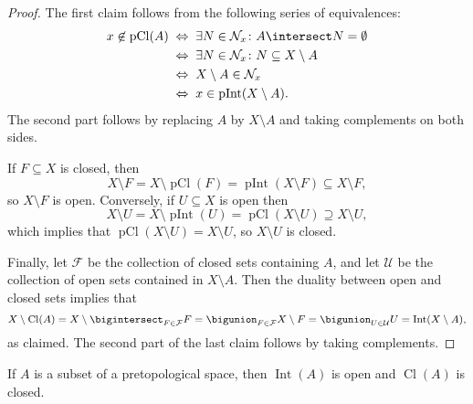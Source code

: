 \documentclass[article, a4paper, 11pt, oneside]{memoir}
\numberwithin{equation}{chapter}
\newcommand{\calU}{\mathcal{U}}
\newcommand{\calF}{\mathcal{F}}
\newcommand{\calN}{\mathcal{N}}
\newcommand{\nhoods}[1]{\calN_{#1}}
\newcommand{\pInt}[1]{\operatorname{pInt}(#1)}
\newcommand{\pCl}[1]{\operatorname{pCl}(#1)}
\renewcommand{\interior}[1]{\operatorname{Int}(#1)}
\renewcommand{\closure}[1]{\operatorname{Cl}(#1)}
\renewcommand{\iff}{\Leftrightarrow}
\begin{document}
\begin{proof}
    The first claim follows from the following series of equivalences:
    \begin{align*}
        x \not\in \pCl{A}
            &\;\iff\; \exists N \in \nhoods{x} \colon A \intersect N = \emptyset \\
            &\;\iff\; \exists N \in \nhoods{x} \colon N \subseteq X \setminus A \\
            &\;\iff\; X \setminus A \in \nhoods{x} \\
            &\;\iff\; x \in \pInt{X \setminus A}.
    \end{align*}
    The second part follows by replacing $A$ by $X \setminus A$ and taking complements on both sides.
    
    If $F \subseteq X$ is closed, then
    \begin{equation*}
        X \setminus F
            = X \setminus \pCl{F}
            = \pInt{X \setminus F}
            \subseteq X \setminus F,
    \end{equation*}
    so $X \setminus F$ is open. Conversely, if $U \subseteq X$ is open then
    \begin{equation*}
        X \setminus U
            = X \setminus \pInt{U}
            = \pCl{X \setminus U}
            \supseteq X \setminus U,
    \end{equation*}
    which implies that $\pCl{X \setminus U} = X \setminus U$, so $X \setminus U$ is closed.
    
    Finally, let $\calF$ be the collection of closed sets containing $A$, and let $\calU$ be the collection of open sets contained in $X \setminus A$. Then the duality between open and closed sets implies that
    \begin{equation*}
        X \setminus \closure{A}
            = X \setminus \bigintersect_{F \in \calF} F
            = \bigunion_{F \in \calF} X \setminus F
            = \bigunion_{U \in \calU} U
            = \interior{X \setminus A},
    \end{equation*}
    as claimed. The second part of the last claim follows by taking complements.
\end{proof}

\begin{corollary}
    \label{thm:interior-open-closure-closed}
    If $A$ is a subset of a pretopological space, then $\interior{A}$ is open and $\closure{A}$ is closed.
\end{corollary}
\end{document}
